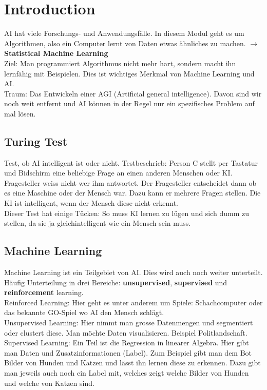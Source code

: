 \section{Introduction}
AI hat viele Forschungs- und Anwendungsfälle. In diesem Modul geht es um Algorithmen, also ein Computer lernt von Daten
etwas ähnliches zu machen. $\rightarrow$ \textbf{Statistical Machine Learning}
\\
\textcolor{myblue}{Ziel:} Man programmiert Algorithmus nicht mehr hart, sondern macht ihn lernfähig mit Beispielen. Dies ist wichtiges Merkmal
von Machine Learning und AI.
\\
\textcolor{myblue}{Traum:} Das Entwickeln einer AGI (Artificial general intelligence). Davon sind wir noch weit entfernt und AI können in der Regel
nur ein spezifisches Problem auf mal lösen.
\subsection{Turing Test}
Test, ob AI intelligent ist oder nicht. Testbeschrieb: Person C stellt per Tastatur und Bidschirm eine beliebige Frage an einen anderen Menschen oder KI. Fragesteller weiss nicht wer ihm antwortet. Der Fragesteller entscheidet dann ob es eine Maschine oder der Mensch war. Dazu kann er mehrere Fragen stellen. Die KI ist intelligent, wenn der Mensch diese nicht erkennt.
\\
Dieser Test hat einige Tücken: So muss KI lernen zu lügen und sich dumm zu stellen, da sie ja gleichintelligent wie ein Mensch sein muss.
\subsection{Machine Learning}
Machine Learning ist ein Teilgebiet von AI. Dies wird auch noch weiter unterteilt. Häufig Unterteilung in drei Bereiche:
\textbf{unsupervised}, \textbf{supervised} und \textbf{reinforcement} learning.\\
\textcolor{myblue}{Reinforced Learning:} Hier geht es unter anderem um Spiele: Schachcomputer oder das bekannte GO-Spiel wo AI den Mensch schlägt.
\\
\textcolor{myblue}{Unsupervised Learning:} Hier nimmt man grosse Datenmengen und segmentiert oder clustert diese. Man möchte Daten visualisieren. Beispiel
Politlandschaft.
\\
\textcolor{myblue}{Supervised Learning:} Ein Teil ist die Regression in linearer Algebra. Hier gibt man Daten und Zusatzinformationen (Label). Zum Beispiel gibt man dem Bot Bilder von Hunden und Katzen und lässt ihn lernen diese zu erkennen. Dazu gibt man jeweils auch noch ein Label mit, welches
zeigt welche Bilder von Hunden und welche von Katzen sind.
